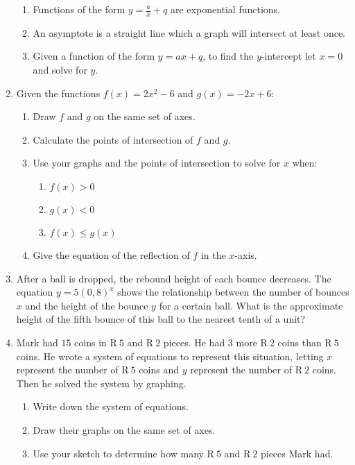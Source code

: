 \begin{eocexercises}{}
\begin{enumerate}[itemsep=9pt, label=\textbf{\arabic*}. ]
\begin{enumerate}[noitemsep, label=\textbf{(\alph*)} ]
    \item Functions of the form $y=\frac{a}{x}+q$ are exponential functions.
    \item  An asymptote is a straight line which a graph will intersect at least once.
    \item Given a function of the form $y=ax+q$, to find the $y$-intercept let $x=0$ and solve for $y$.
    \end{enumerate}
  \item Given the functions $f(x)=2{x}^{2}-6$ and $g(x)=-2x+6$:
    \begin{enumerate}[noitemsep, label=\textbf{(\alph*)} ] %
    \item Draw $f$ and $g$ on the same set of axes.
    \item Calculate the points of intersection of $f$ and $g$.
    \item Use your graphs and the points of intersection to solve for $x$ when:
      \begin{enumerate}[noitemsep, label=\textbf{\roman*}. ] %
      \item $f(x)>0$
      \item $g(x)<0$
      \item $f(x)\leq g(x)$
      \end{enumerate}
    \item Give the equation of the reflection of $f$ in the $x$-axis.
    \end{enumerate}
  \item After a ball is dropped, the rebound height of each bounce
    decreases. The equation $y=5{(0,8)}^{x}$ shows the relationship
    between the number of bounces $x$ and the height of the bounce $y$
    for a certain ball.  What is the approximate height of the fifth
    bounce of this ball to the nearest tenth of a unit?
  \item Mark had $15$ coins in R$~5$ and R$~2$ pieces. He had $3$ more
    R$~2$ coins than R$~5$ coins. He wrote a system of equations to
    represent this situation, letting $x$ represent the number of R$~5$
    coins and $y$ represent the number of R$~2$ coins. Then he solved
    the system by graphing.
    \begin{enumerate}[noitemsep, label=\textbf{(\alph*)} ] %
    \item Write down the system of equations.
    \item Draw their graphs on the same set of axes.
    \item Use your sketch to determine how many R$~5$ and R$~2$ pieces Mark had.

\end{enumerate}
\end{enumerate}
\end{eocexercises}
